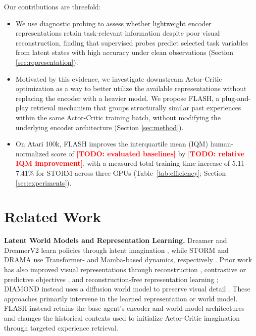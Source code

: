 \documentclass{article} %
\newcommand{\todo}[1]{\textcolor{red}{\textbf{[TODO: #1]}}}
\begin{document}
Our contributions are threefold:
\begin{itemize}
    \item We use diagnostic probing to assess whether lightweight encoder representations retain task-relevant information despite poor visual reconstruction, finding that supervised probes predict selected task variables from latent states with high accuracy under clean observations (Section \ref{sec:representation}).
    \item Motivated by this evidence, we investigate downstream Actor-Critic optimization as a way to better utilize the available representations without replacing the encoder with a heavier model. We propose FLASH, a plug-and-play retrieval mechanism that groups structurally similar past experiences within the same Actor-Critic training batch, without modifying the underlying encoder architecture (Section \ref{sec:method}).
    \item On Atari 100k, FLASH improves the interquartile mean (IQM) human-normalized score of \todo{evaluated baselines} by \todo{relative IQM improvement}, with a measured total training time increase of 5.11--7.41\% for STORM across three GPUs (Table~\ref{tab:efficiency}; Section \ref{sec:experiments}).
\end{itemize}

\section{Related Work}
\label{sec:related}

\textbf{Latent World Models and Representation Learning.}
Dreamer and DreamerV2 learn policies through latent imagination \citep{hafner2019dream, hafner2020mastering}, while STORM and DRAMA use Transformer- and Mamba-based dynamics, respectively \citep{zhang2023storm, wang2025drama}. Prior work has also improved visual representations through reconstruction \citep{hafner2019learning}, contrastive or predictive objectives \citep{laskin2020curl, schwarzer2020data}, and reconstruction-free representation learning \citep{stooke2021decoupling, deng2022dreamerpro}; DIAMOND instead uses a diffusion world model to preserve visual detail \citep{alonso2024diffusion}. These approaches primarily intervene in the learned representation or world model. FLASH instead retains the base agent's encoder and world-model architectures and changes the historical contexts used to initialize Actor-Critic imagination through targeted experience retrieval.
\end{document}
